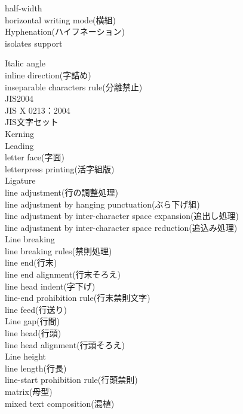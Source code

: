 \begin{description}
    \item[half-width]
    \item[horizontal writing mode(横組)]
    \item[Hyphenation(ハイフネーション)]
    \item[isolates support]\cite{developer.apple.com:videos/play/wwdc2016/232/}
    \item[Italic angle]
    \item[inline direction(字詰め)]
    \item[inseparable characters rule(分離禁止)]
    \item[JIS2004]
    \item[JIS X 0213：2004]
    \item[JIS文字セット]
    \item[Kerning]
    \item[Leading]
    \item[letter face(字面)]
    \item[letterpress printing(活字組版)]
    \item[Ligature]
    \item[line adjustment(行の調整処理)]
    \item[line adjustment by hanging punctuation(ぶら下げ組)]
    \item[line adjustment by inter-character space expansion(追出し処理)]
    \item[line adjustment by inter-character space reduction(追込み処理)]
    \item[Line breaking]
    \item[line breaking rules(禁則処理)]
    \item[line end(行末)]
    \item[line end alignment(行末そろえ)]
    \item[line head indent(字下げ)]
    \item[line-end prohibition rule(行末禁則文字)]
    \item[line feed(行送り)]
    \item[Line gap(行間)]
    \item[line head(行頭)]
    \item[line head alignment(行頭そろえ)]
    \item[Line height]
    \item[line length(行長)]
    \item[line-start prohibition rule(行頭禁則)]
    \item[matrix(母型)]
    \item[mixed text composition(混植)]

\end{description}
